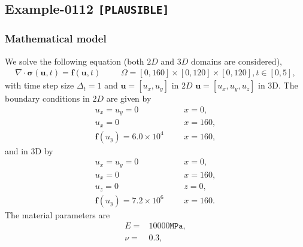 %
\clearpage
%
\subsection{Example-0112 \texttt{[PLAUSIBLE]}}
%
%
\subsubsection{Mathematical model}
%
We solve the following equation (both $2D$ and $3D$ domains are considered),
%
\begin{align}
    \nabla \cdot \boldsymbol{\sigma} (\boldsymbol{u}, t) = \boldsymbol{f} (\boldsymbol{u}, t) & &&\Omega = [0, 160] \times [0, 120] \times [0, 120], t \in [0, 5],
\end{align}
%
with time step size $\Delta_t = 1$ and $\boldsymbol{u} = [u_x,u_y]$ in $2D$ $\boldsymbol{u} = [u_x,u_y,u_z]$ in 3D. The boundary conditions in $2D$ are given by
%
\begin{align}
    u_x = u_y = 0 & &&x = 0, \\
    u_x = 0 & &&x = 160, \\
		\boldsymbol{f} (u_y) = 6.0 \times 10^{4} & &&x = 160,
\end{align}
%
and in 3D by
\begin{align}
    u_x = u_y = 0 & &&x = 0, \\
		u_x = 0 & &&x = 160, \\
    u_z = 0 & &&z = 0, \\
		\boldsymbol{f} (u_y) = 7.2 \times 10^{6} & &&x = 160.
\end{align}
The material parameters are
\begin{align}
    E = & 10000\texttt{MPa}, \\
    \nu = & 0.3, \\
\end{align}
%
%
